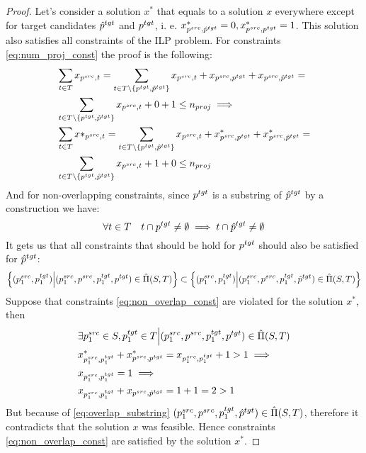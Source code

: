 \begin{proof}
  Let's consider a solution \( x^* \) that equals
  to a solution \( x \) everywhere except for target candidates \( \hat{p}^{tgt}  \) and \(  p^{tgt} \),
  i. e. \( x^*_{p^{src}, \hat{p}^{tgt}} = 0, x^*_{p^{src}, p^{tgt}} = 1 \). This solution also satisfies all constraints
  of the ILP problem. For constraints \eqref{eq:num_proj_const} the proof is the following:
  \begin{align*}
    & \sum\limits_{t \in T} x_{p^{src}, t} =
    \sum\limits_{t \in T \setminus \{ p^{tgt}, \hat{p}^{tgt} \}} x_{p^{src}, t} + x_{p^{src}, p^{tgt}} + x_{p^{src}, \hat{p}^{tgt}}  =     \\
    & \sum\limits_{t \in T \setminus \{ p^{tgt}, \hat{p}^{tgt} \}} x_{p^{src}, t} + 0 + 1
    \leq n_{proj} \implies                                                                                                                 \\
    & \sum\limits_{t \in T} x*_{p^{src}, t} =
    \sum\limits_{t \in T \setminus \{ p^{tgt}, \hat{p}^{tgt} \}} x_{p^{src}, t} + x^*_{p^{src}, p^{tgt}} + x^*_{p^{src}, \hat{p}^{tgt}}  = \\
    & \sum\limits_{t \in T \setminus \{ p^{tgt}, \hat{p}^{tgt} \}} x_{p^{src}, t} + 1 + 0 \leq n_{proj}
  \end{align*}
  And for non-overlapping constraints, since \( p^{tgt} \) is a substring of \( \hat{p}^{tgt} \) by a
  construction we have:
  \[
    \forall t \in T \quad t \cap p^{tgt} \neq \emptyset \implies t \cap \hat{p}^{tgt} \neq \emptyset
  \]
  It gets us that all constraints that should be hold for \( p^{tgt} \) should also be satisfied for \( \hat{p}^{tgt} \):
  \begin{equation} \label{eq:overlap_substring}
    \left\{ (p_1^{src}, p_1^{tgt}) \Big| (p_1^{src}, p^{src}, p_1^{tgt}, p^{tgt}) \in \hat{\Pi}(S, T) \right\} \subset
    \left\{ (p_1^{src}, p_1^{tgt}) \Big| (p_1^{src}, p^{src}, p_1^{tgt}, \hat{p}^{tgt}) \in \hat{\Pi}(S, T) \right\}
  \end{equation}
  Suppose that constraints \eqref{eq:non_overlap_const} are violated for the solution \( x^* \), then
  \begin{align*}
    & \exists p_1^{src} \in S, p_1^{tgt} \in T \Big| (p_1^{src}, p^{src}, p_1^{tgt}, p^{tgt}) \in \hat{\Pi}(S, T) \\
    & x^*_{p_1^{src}, p_1^{tgt}} + x^*_{p^{src}, p^{tgt}} =
    x_{p_1^{src}, p_1^{tgt}} + 1 > 1 \implies                                                                      \\
    & x_{p_1^{src}, p_1^{tgt}} = 1
    \implies                                                                                                       \\
    & x_{p_1^{src}, p_1^{tgt}} + x_{p^{src}, \hat{p}^{tgt}} = 1 + 1 = 2 > 1
  \end{align*}
  But because of \eqref{eq:overlap_substring}
  \( (p_1^{src}, p^{src}, p_1^{tgt}, \hat{p}^{tgt} ) \in \hat{\Pi}(S, T) \),
  therefore it contradicts that the solution \( x \) was feasible.
  Hence constraints \eqref{eq:non_overlap_const} are satisfied by the solution \( x^* \).


\end{proof}
